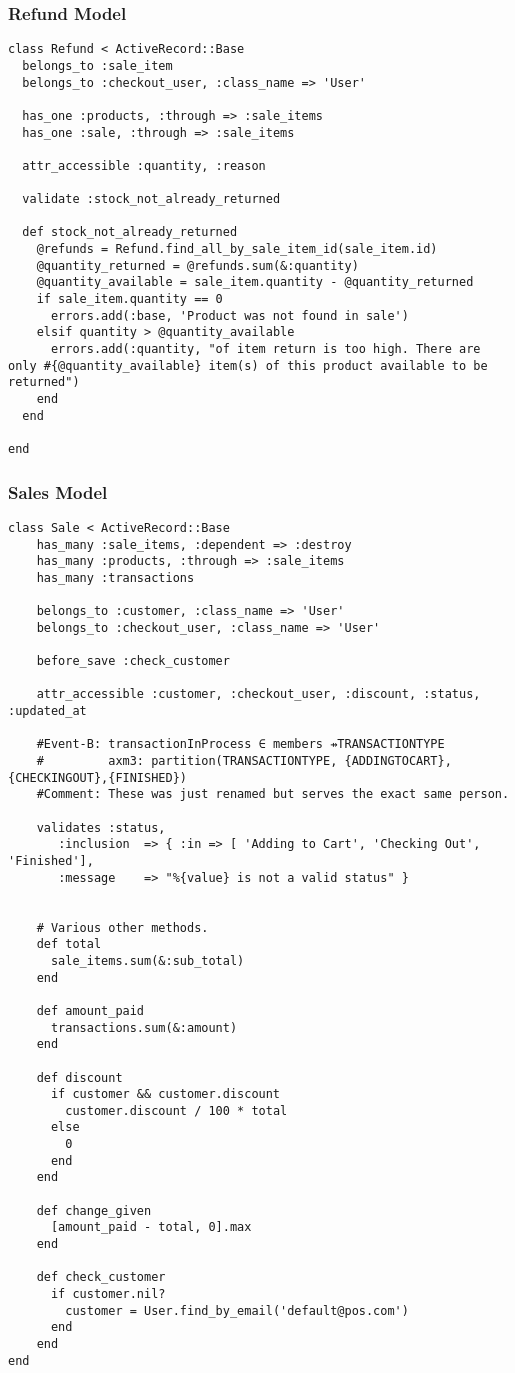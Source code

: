 \documentclass[a4paper]{article}
\begin{document}
\subsubsection{Refund Model}
\begin{verbatim}
class Refund < ActiveRecord::Base
  belongs_to :sale_item
  belongs_to :checkout_user, :class_name => 'User'
  
  has_one :products, :through => :sale_items
  has_one :sale, :through => :sale_items
  
  attr_accessible :quantity, :reason
  
  validate :stock_not_already_returned
  
  def stock_not_already_returned
    @refunds = Refund.find_all_by_sale_item_id(sale_item.id)
    @quantity_returned = @refunds.sum(&:quantity)
    @quantity_available = sale_item.quantity - @quantity_returned
    if sale_item.quantity == 0
      errors.add(:base, 'Product was not found in sale')
    elsif quantity > @quantity_available
      errors.add(:quantity, "of item return is too high. There are only #{@quantity_available} item(s) of this product available to be returned")
    end
  end
  
end

\end{verbatim}
\subsubsection{Sales Model}
\begin{verbatim}
class Sale < ActiveRecord::Base
    has_many :sale_items, :dependent => :destroy
    has_many :products, :through => :sale_items
    has_many :transactions

    belongs_to :customer, :class_name => 'User'
    belongs_to :checkout_user, :class_name => 'User'

    before_save :check_customer

    attr_accessible :customer, :checkout_user, :discount, :status, :updated_at

    #Event-B: transactionInProcess ∈ members ⇸TRANSACTIONTYPE
    #         axm3: partition(TRANSACTIONTYPE, {ADDINGTOCART},{CHECKINGOUT},{FINISHED})
    #Comment: These was just renamed but serves the exact same person.

    validates :status,
       :inclusion  => { :in => [ 'Adding to Cart', 'Checking Out', 'Finished'],
       :message    => "%{value} is not a valid status" }


    # Various other methods.
    def total
      sale_items.sum(&:sub_total)
    end

    def amount_paid
      transactions.sum(&:amount)
    end

    def discount
      if customer && customer.discount
        customer.discount / 100 * total
      else
        0
      end
    end

    def change_given
      [amount_paid - total, 0].max
    end

    def check_customer
      if customer.nil?
        customer = User.find_by_email('default@pos.com')
      end
    end
end

\end{verbatim}
\end{document}
